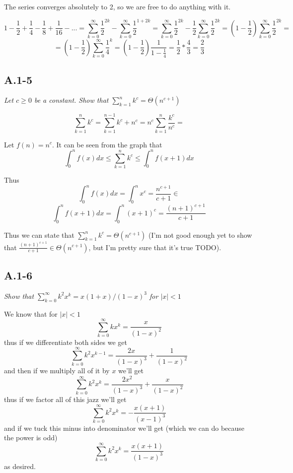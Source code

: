 \documentclass[11pt,oneside,titlepage]{book}
\begin{document}
The series converges absolutely to 2, so we are free to do anything with it.

$$1 - \frac 1 2 + \frac 1 4 - \frac 1 8
+ \frac{1}{16} - ... = 
\sum_{k = 0}^{\infty}{\frac{1}{2}^{2k}}
- \sum_{k = 0}^{\infty}{\frac{1}{2}^{1 + 2k}} =
\sum_{k = 0}^{\infty}{\frac{1}{2}^{2k}}
- \frac{1}{2}\sum_{k = 0}^{\infty}{\frac{1}{2}^{2k}} =
\left(1 - \frac{1}{2}\right)\sum_{k = 0}^{\infty}{\frac{1}{2}^{2k}} = 
$$
$$
= \left(1 - \frac{1}{2}\right)\sum_{k = 0}^{\infty}{\frac{1}{4}^{k}}
= \left(1 - \frac{1}{2}\right)\frac{1}{1 - \frac{1}{4}}
= \frac 1 2 *  \frac 4 3 = \frac 2 3
$$

\subsection*{A.1-5}
\textit{Let $c \geq 0$ be a constant. Show that
  $\sum_{k = 1}^{n}{k^c} = \Theta(n^{c + 1})$}

$$
\sum_{k = 1}^{n}{k^c} = \sum_{k = 1}^{n - 1}{k^c} + n^c =
n^c\sum_{k = 1}^{n}{\frac{k^c}{n^c}} =
$$

Let $f(n) = n^c$.
It can be seen from the graph that
$$\int_{0}^{n}{f(x)dx} \leq \sum_{k = 1}^{n}{k^c} \leq
\int_{0}^{n}{f(x + 1)dx}$$

Thus 
$$\int_0^n{f(x)dx} = \int_0^n{x^c} = \frac{n^{c + 1}}{c + 1} \in$$
$$\int_0^n{f(x + 1)dx} = \int_0^n{(x + 1)^c} = \frac{(n + 1)^{c + 1}}{c + 1}$$

Thus we can state that $\sum_{k = 1}^{n}{k^c} = \Theta(n^{c + 1})$
(I'm not good enough yet to show that $\frac{(n + 1)^{c + 1}}{c + 1} \in
\Theta(n^{c + 1})$, but I'm pretty sure that it's true TODO).



\subsection*{A.1-6}
\textit{Show that $\sum_{k=0}^{\infty}{k^2 x^k} = x(1 + x)/(1 - x)^3$ for
  $|x| < 1$}

We know that for $|x| < 1$
$$\sum_{k = 0}^{\infty}{kx^k} = \frac{x}{(1 - x)^2}$$
thus if we differentiate both sides we get
$$\sum_{k = 0}^{\infty}{k^2x^{k - 1}} = \frac{2x}{(1 - x)^3}
+ \frac{1}{(1 - x)^2} $$
and then if we multiply all of it by $x$ we'll get
$$\sum_{k = 0}^{\infty}{k^2x^k} = \frac{2x^2}{(1 - x)^3}
+ \frac{x}{(1 - x)^2} $$
thus if we factor all of this jazz we'll get
$$\sum_{k = 0}^{\infty}{k^2x^k} = - \frac{x(x + 1)}{(x - 1)^3}$$
and if we tuck this minus into denominator we'll get (which we can do because
the power is odd)
$$\sum_{k = 0}^{\infty}{k^2x^k} = \frac{x(x + 1)}{(1 - x)^3}$$
as desired.
\end{document}
